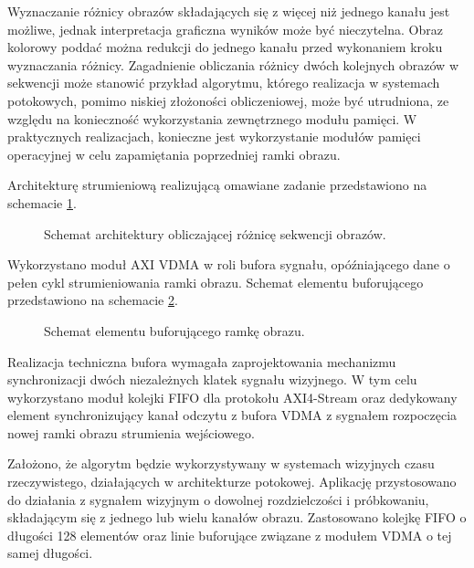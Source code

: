 Wyznaczanie różnicy obrazów składających się z więcej niż jednego kanału jest możliwe, jednak interpretacja graficzna wyników może być nieczytelna. Obraz kolorowy poddać można redukcji do jednego kanału przed wykonaniem kroku wyznaczania różnicy.
Zagadnienie obliczania różnicy dwóch kolejnych obrazów w sekwencji może stanowić przykład algorytmu, którego realizacja w systemach potokowych, pomimo niskiej złożoności obliczeniowej, może być utrudniona, ze względu na konieczność wykorzystania zewnętrznego modułu pamięci.%
W praktycznych realizacjach, konieczne jest wykorzystanie modułów pamięci operacyjnej w celu zapamiętania poprzedniej ramki obrazu. %

Architekturę strumieniową realizującą omawiane zadanie przedstawiono na schemacie \ref{fig:frame-difference}.

\begin{figure}[h]
	\centering
	\def\svgwidth{\textwidth}
	
	\caption{Schemat architektury obliczającej różnicę sekwencji obrazów.}
	\label{fig:frame-difference}
\end{figure}

Wykorzystano moduł AXI VDMA w roli bufora sygnału, opóźniającego dane o pełen cykl strumieniowania ramki obrazu. Schemat elementu buforującego przedstawiono na schemacie \ref{fig:vdma-buffer}.
\begin{figure}[h]
	\centering
	\def\svgwidth{\textwidth}
	
	\caption{Schemat elementu buforującego ramkę obrazu.}
	\label{fig:vdma-buffer}
\end{figure}

Realizacja techniczna bufora wymagała zaprojektowania mechanizmu synchronizacji dwóch niezależnych klatek sygnału wizyjnego. 
W tym celu wykorzystano moduł kolejki FIFO dla protokołu AXI4-Stream oraz dedykowany element synchronizujący kanał odczytu z bufora VDMA z sygnałem rozpoczęcia nowej ramki obrazu strumienia wejściowego. %

Założono, że algorytm będzie wykorzystywany w systemach wizyjnych czasu rzeczywistego, działających w architekturze potokowej. 
Aplikację przystosowano do działania z sygnałem wizyjnym o dowolnej rozdzielczości i próbkowaniu, składającym się z jednego lub wielu kanałów obrazu.
Zastosowano kolejkę FIFO o długości 128 elementów oraz linie buforujące związane z modułem VDMA o tej samej długości.


